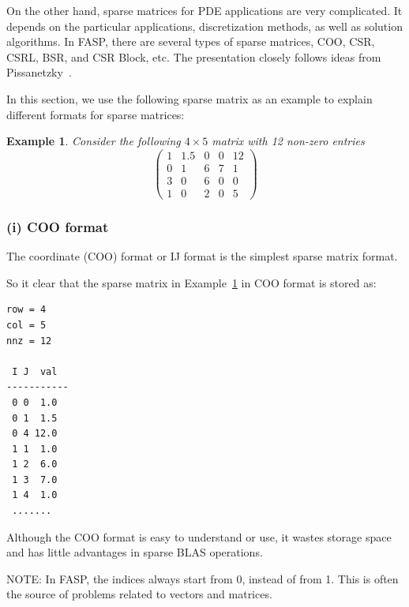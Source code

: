 \documentclass[11pt]{memoir}
\newtheorem{example}[theorem]{Example}
\begin{document}
On the other hand, sparse matrices for PDE applications are very complicated. It depends on the particular applications, discretization methods, as well as solution algorithms. In FASP, there are several types of sparse matrices, COO, CSR, CSRL, BSR, and CSR Block, etc. The presentation closely follows ideas from Pissanetzky~\cite{Pissanetzky.Pissanetzky.1984hc}.

In this section, we use the following sparse matrix as an example to explain different formats for sparse matrices:
%
\begin{example}\label{ex:sparse}
Consider the following $4\times 5$ matrix with 12 non-zero entries
$$
\left(\begin{array}{ccccc}
1 & 1.5 & 0 & 0 & 12\\
0 & 1    & 6 & 7 & 1\\
3 & 0    & 6 & 0 & 0\\
1 & 0    & 2 & 0 & 5
\end{array}
\right)
$$
\end{example}

\subsubsection*{(i) COO format}

The coordinate (COO) format or IJ format is the simplest sparse matrix format.
%

%

So it clear that the sparse matrix in Example~\ref{ex:sparse} in COO format is stored as:
%
\begin{lstlisting}[numbers=none]
row = 4
col = 5
nnz = 12

 I J  val
-----------
 0 0  1.0
 0 1  1.5
 0 4 12.0
 1 1  1.0
 1 2  6.0
 1 3  7.0
 1 4  1.0
 .......
\end{lstlisting}
%
Although the COO format is easy to understand or use, it wastes storage space and has little advantages in sparse BLAS operations.

\begin{snugshade}\noindent
NOTE: In FASP, the indices always start from 0, instead of from 1. This is often the source of problems related to vectors and matrices.
\end{snugshade}
\end{document}

